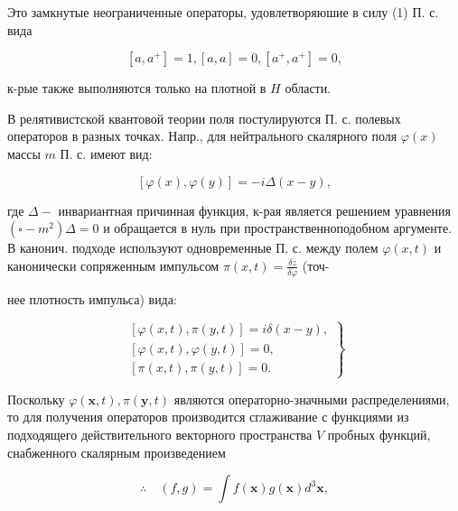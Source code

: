 \documentclass[10pt]{article}
\begin{document}
Это замкнутые неограниченные операторы, удовлетворяюшие в силу (1) П. с. вида



\[

\left[a, a^{+}\right]=1,[a, a]=0,\left[a^{+}, a^{+}\right]=0,

\]



к-рые также выполняются только на плотной в $H$ области.



В релятивистской квантовой теории поля постулируются П. с. полевых операторов в разных точках. Напр., для нейтрального скалярного поля $\varphi(x)$ массы $m$ П. с. имеют вид:



\[

[\varphi(x), \varphi(y)]=-i \Delta(x-y),

\]



где $\Delta-$ инвариантная причинная функция, к-рая является решением уравнения $\left(\square-m^{2}\right) \Delta=0$ и обращается в нуль при пространственноподобном аргументе. В канонич. подходе используют одновременные П. с. между полем $\varphi(x, t)$ и канонически сопряженным импульсом $\pi(x, t)=\frac{\delta z}{\delta \dot{\varphi}}$ (точ-

нее плотность импульса) вида:



\[

\left.\begin{array}{l}

{[\varphi(x, t), \pi(y, t)]=i \delta(x-y),} \\

{[\varphi(x, t), \varphi(y, t)]=0,} \\

{[\pi(x, t), \pi(y, t)]=0 .}

\end{array}\right\}

\]



Поскольку $\varphi(\boldsymbol{x}, t), \pi(\boldsymbol{y}, t)$ являются операторно-значными распределениями, то для получения операторов производится сглаживание с функциями из подходящего действительного векторного пространства $V$ пробных функций, снабженного скалярным произведением



\[

\therefore \quad(f, g)=\int f(\boldsymbol{x}) g(\boldsymbol{x}) d^{3} \boldsymbol{x},

\]
\end{document}
